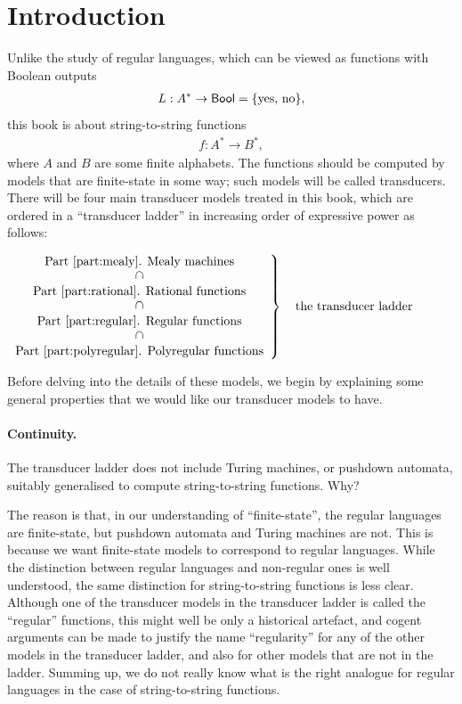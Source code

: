 \section*{Introduction}
Unlike the study of regular languages, which can be viewed as functions with Boolean outputs
\begin{align*}
L : A^* \to \mathsf{Bool} = \{\text{yes, no}\},
\end{align*}
this book is about string-to-string functions
\begin{align*}
f : A^* \to B^*,
\end{align*}
where $A$ and $B$ are some finite alphabets. The functions should  be computed by models that are finite-state in some way; such models will be called transducers. There will be four main transducer models treated in this book, which are ordered in a ``transducer ladder'' in  increasing order of expressive power as follows: 

\begin{center}
$\left.
\begin{array}{c}
    \text{Part~\ref{part:mealy}. Mealy machines} \\ 
    \rotatebox{90}{$\supset$} \\
    \text{Part~\ref{part:rational}. Rational functions} \\ 
    \rotatebox{90}{$\supset$} \\
    \text{Part~\ref{part:regular}. Regular functions} \\
    \rotatebox{90}{$\supset$} \\
    \text{Part~\ref{part:polyregular}. Polyregular functions}
\end{array}
\right\} \quad \text{the transducer ladder}$
\end{center}

Before delving into the details of these models, we begin by explaining some general properties that we would like our transducer models to have.  

\paragraph*{Continuity.} The transducer  ladder does not include Turing machines, or pushdown automata, suitably generalised to compute string-to-string functions. Why? 

The reason is that, in  our understanding of ``finite-state'', the  regular languages are finite-state, but pushdown automata and Turing machines are not.  This is because we want finite-state models to correspond to regular languages. While the distinction between regular languages and non-regular ones is well understood,  the same distinction for string-to-string functions is less clear.  Although one of the  transducer models in the transducer ladder is  called the ``regular'' functions, this might well be only  a historical artefact, and cogent arguments can be made to justify the name  ``regularity'' for any of  the other models in the transducer ladder, and also for other models that are not in the ladder. Summing up, we do not really know what is the right analogue for regular languages in the case of  string-to-string functions.

